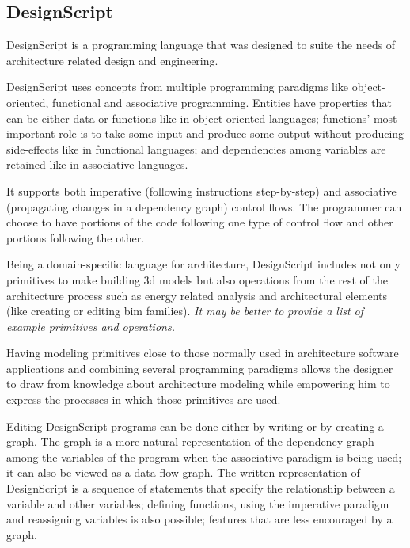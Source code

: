 \documentclass{./llncs2e/llncs}
\begin{document}
\subsection{DesignScript\cite{aish2012designscript}}
	DesignScript is a programming language that was designed to suite the needs of architecture related design and engineering.

	DesignScript uses concepts from multiple programming paradigms like object-oriented, functional and associative programming. 
	Entities have properties that can be either data or functions like in object-oriented languages; functions' most important role is to take some input and produce some output without producing side-effects like in functional languages; and dependencies among variables are retained like in associative languages.

	It supports both imperative (following instructions step-by-step) and associative (propagating changes in a dependency graph) control flows. 
	The programmer can choose to have portions of the code following one type of control flow and other portions following the other.

	Being a domain-specific language for architecture, DesignScript includes not only primitives to make building 3d models but also operations from the rest of the architecture process such as energy related analysis and architectural elements (like creating or editing \ac{bim} families).
	\emph{It may be better to provide a list of example primitives and operations.}

	Having modeling primitives close to those normally used in architecture software applications and combining several programming paradigms allows the designer to draw from knowledge about architecture modeling while empowering him to express the processes in which those primitives are used.

	Editing DesignScript programs can be done either by writing or by creating a graph. 
	The graph is a more natural representation of the dependency graph among the variables of the program when the associative paradigm is being used; it can also be viewed as a data-flow graph. 
	The written representation of DesignScript is a sequence of statements that specify the relationship between a variable and other variables; defining functions, using the imperative paradigm and reassigning variables is also possible; features that are less encouraged by a graph.
\end{document}
